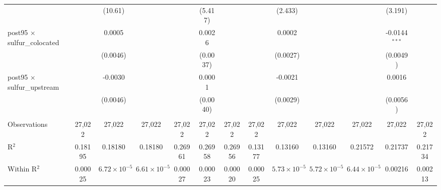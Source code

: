 \begin{table}[htbp]
\begin{adjustbox}{width = \textwidth, center}
\begin{tabular}{lcccccccccccc}
                                                            &               & (10.61)               &                       &               & (5.417)        &               &               & (2.433)               &                       &                       & (3.191)         &   \\   
         post95 $\times$ sulfur\_colocated                  &               & 0.0005                &                       &               & 0.0026         &               &               & 0.0002                &                       &                       & -0.0144$^{***}$ &   \\   
                                                            &               & (0.0046)              &                       &               & (0.0037)       &               &               & (0.0027)              &                       &                       & (0.0049)        &   \\   
         post95 $\times$ sulfur\_upstream                   &               & -0.0030               &                       &               & 0.0001         &               &               & -0.0021               &                       &                       & 0.0016          &   \\   
                                                            &               & (0.0046)              &                       &               & (0.0040)       &               &               & (0.0029)              &                       &                       & (0.0056)        &   \\   
          \\
         Observations                                       & 27,022        & 27,022                & 27,022                & 27,022        & 27,022         & 27,022        & 27,022        & 27,022                & 27,022                & 27,022                & 27,022          & 27,022\\  
         R$^2$                                              & 0.18195       & 0.18180               & 0.18180               & 0.26961       & 0.26958        & 0.26956       & 0.13177       & 0.13160               & 0.13160               & 0.21572               & 0.21737         & 0.21734\\  
         Within R$^2$                                       & 0.00025       & $6.72\times 10^{-5}$  & $6.61\times 10^{-5}$  & 0.00027       & 0.00023        & 0.00020       & 0.00025       & $5.73\times 10^{-5}$  & $5.72\times 10^{-5}$  & $6.44\times 10^{-5}$  & 0.00216         & 0.00213\\  

\end{tabular}
\end{adjustbox}
\end{table}
